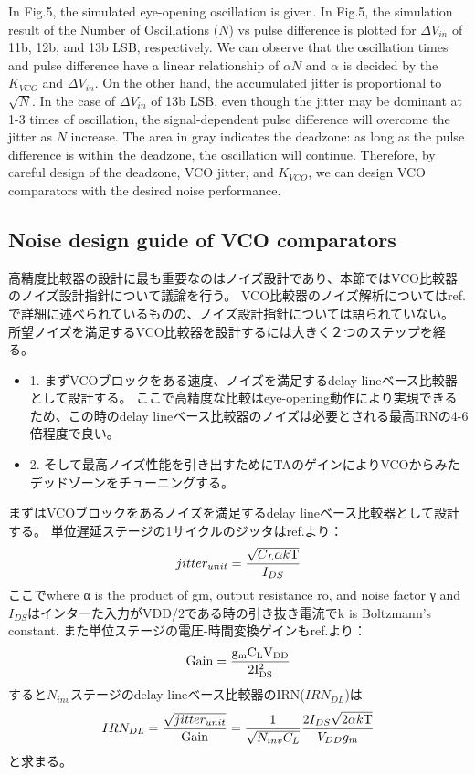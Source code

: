 \documentclass[letterpaper, 10 pt, conference]{ieeeconf}  %
\begin{document}
In Fig.5, the simulated eye-opening oscillation is given. In Fig.5, the simulation result of the Number of Oscillations ($N$) vs pulse difference is plotted for $\Delta V_{in}$ of 11b, 12b, and 13b LSB, respectively. We can observe that the oscillation times and pulse difference have a linear relationship of $\alpha N$ and $\alpha$ is decided by the $K_{VCO}$ and $\Delta V_{in}$. On the other hand, the accumulated jitter is proportional to $\sqrt N$\cite{hajimiri1999jitter,abidi2006phase}. In the case of $\Delta V_{in}$ of 13b LSB, even though the jitter may be dominant at 1-3 times of oscillation, the signal-dependent pulse difference will overcome the jitter as $N$ increase. The area in gray indicates the deadzone: as long as the pulse difference is within the deadzone, the oscillation will continue. Therefore, by careful design of the deadzone, VCO jitter, and $K_{VCO}$, we can design VCO comparators with the desired noise performance.

\subsection{Noise design guide of VCO comparators}
高精度比較器の設計に最も重要なのはノイズ設計であり、本節ではVCO比較器のノイズ設計指針について議論を行う。
VCO比較器のノイズ解析についてはref.\cite{luo2020input, ding20190}で詳細に述べられているものの、ノイズ設計指針については語られていない。
所望ノイズを満足するVCO比較器を設計するには大きく２つのステップを経る。
\begin{itemize}
\item 1. まずVCOブロックをある速度、ノイズを満足するdelay lineベース比較器として設計する。
ここで高精度な比較はeye-opening動作により実現できるため、この時のdelay lineベース比較器のノイズは必要とされる最高IRNの4-6倍程度で良い。
\item 2. そして最高ノイズ性能を引き出すためにTAのゲインによりVCOからみたデッドゾーンをチューニングする。
\end{itemize}

まずはVCOブロックをあるノイズを満足するdelay lineベース比較器として設計する。
単位遅延ステージの1サイクルのジッタはref.\cite{timecomp}より：
\begin{eqnarray}
    \centering
    jitter_{unit} = \frac{\sqrt{C_L\alpha k \rm{T}}}{I_{DS}}
    \label{ddnr}
\end{eqnarray}
ここでwhere α is the product of gm, output resistance ro, and noise factor γ and $I_{DS}$はインターた入力がVDD/2である時の引き抜き電流でk is Boltzmann’s constant.
また単位ステージの電圧-時間変換ゲインもref.\cite{timecomp}より：
\begin{eqnarray}
    \centering
    \rm{Gain} = \frac{g_mC_LV_{DD}}{2I_{DS}^2}
    \label{ddnr}
\end{eqnarray}
すると$N_{inv}$ステージのdelay-lineベース比較器のIRN($IRN_{DL}$)は
\begin{eqnarray}
    \centering
    IRN_{DL} = \frac{\sqrt{jitter_{unit}}}{\rm{Gain}} = \frac{1}{\sqrt{N_{inv}C_L}}\frac{2I_{DS}\sqrt{2\alpha k\rm{T}}}{V_{DD}g_m}
    \label{delaylineIRN}
\end{eqnarray}
と求まる。
\end{document}
